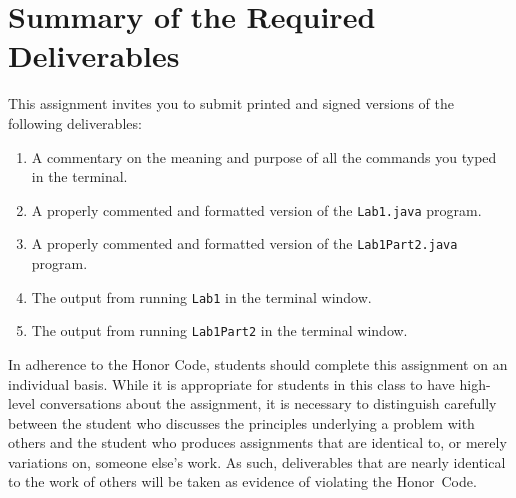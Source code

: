 \section*{Summary of the Required Deliverables}

This assignment invites you to submit printed and signed versions of the following deliverables: 

\begin{enumerate}
  \item A commentary on the meaning and purpose of all the commands you typed in the terminal.
  \item A properly commented and formatted version of the {\tt Lab1.java} program.
  \item A properly commented and formatted version of the {\tt Lab1Part2.java} program.
  \item The output from running {\tt Lab1} in the terminal window.
  \item The output from running {\tt Lab1Part2} in the terminal window.
\end{enumerate}

In adherence to the Honor Code, students should complete this assignment on an individual basis. While it is appropriate for
students in this class to have high-level conversations about the assignment, it is necessary to distinguish carefully between the
student who discusses the principles underlying a problem with others and the student who produces assignments that are identical
to, or merely variations on, someone else's work.  As such, deliverables that are nearly identical to the work of others will be
taken as evidence of violating the \mbox{Honor Code}.  




